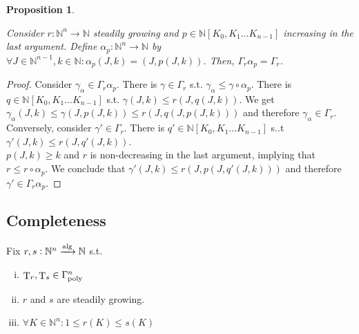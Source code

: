 \documentclass[11pt]{article}
\numberwithin{equation}{section}
\theoremstyle{definition}
\theoremstyle{plain}
\newtheorem{proposition}{Proposition}[section]
\DeclareMathOperator{\T}{T}
\newcommand{\Nats}{\mathbb{N}}
\newcommand{\NatPoly}{\Nats[K_0, K_1 \ldots K_{n-1}]}
\newcommand{\NatFun}{\Nats^n \rightarrow}
\newcommand{\Fall}{\mathcal{F}}
\newcommand{\GammaPoly}{\Gamma_{\textnormal{poly}}}
\newcommand{\Alg}{\xrightarrow{\textnormal{alg}}}
\begin{document}
\begin{samepage}
\begin{proposition}
\label{prp:gamma_r_alpha_p}

Consider ${r: \NatFun \Nats}$ steadily growing and ${p \in \NatPoly}$ increasing in the last argument. Define ${\alpha_p: \NatFun \Nats}$ by ${\forall J \in \Nats^{n-1}, k \in \Nats: \alpha_p(J,k)=(J,p(J,k))}$. Then, ${\Gamma_r \alpha_p = \Gamma_r}$.

\end{proposition}
\end{samepage}

\begin{proof}

Consider ${\gamma_\alpha \in \Gamma_r \alpha_p}$. There is ${\gamma \in \Gamma_r}$ s.t. ${\gamma_\alpha \leq \gamma \circ \alpha_p}$. There is ${q \in \NatPoly}$ s.t. ${\gamma(J,k) \leq r(J,q(J,k))}$. We get ${\gamma_\alpha(J,k) \leq \gamma(J,p(J,k)) \leq r(J,q(J,p(J,k)))}$ and therefore ${\gamma_\alpha \in \Gamma_r}$. Conversely, consider ${\gamma' \in \Gamma_r}$. There is ${q' \in \NatPoly}$ s..t ${\gamma'(J,k) \leq r(J,q'(J,k))}$.\\ $p(J,k) \geq k$ and ${r}$ is non-decreasing in the last argument, implying that ${r \leq r \circ \alpha_p}$. We conclude that ${\gamma'(J,k) \leq r(J,p(J,q'(J,k)))}$ and therefore ${\gamma' \in \Gamma_r \alpha_p}$.
%
\end{proof}

\subsection{Completeness}


Fix ${r,s: \Nats^n \Alg \Nats}$ s.t.

\begin{enumerate}[(i)]

\item ${\T_r, \T_s \in \GammaPoly^n}$

\item ${r}$ and ${s}$ are steadily growing.

\item ${\forall K \in \Nats^n: 1 \leq r(K) \leq s(K)}$

\end{enumerate}
\end{document}
